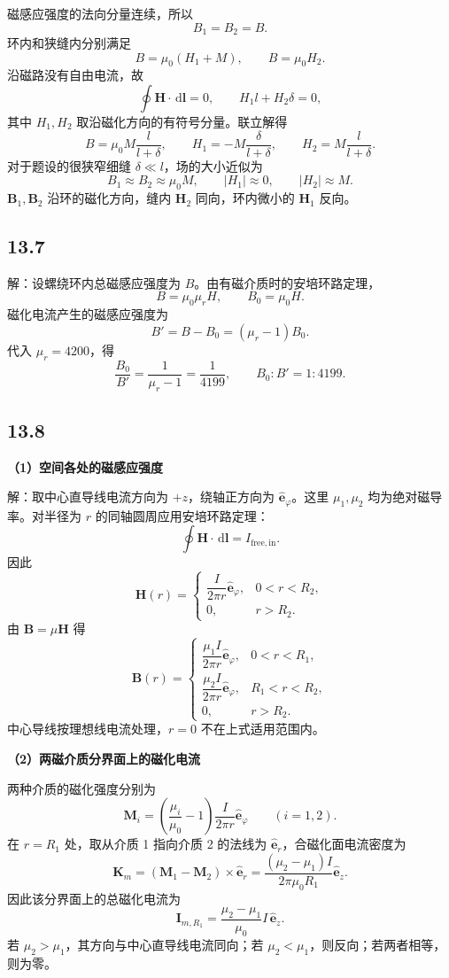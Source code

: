 \documentclass[UTF8,a4paper,12pt]{ctexart}
\newcommand{\dd}{\,\mathrm{d}}
\newcommand{\ez}{\hat{\bm e}_z}
\newcommand{\er}{\hat{\bm e}_r}
\newcommand{\ep}{\hat{\bm e}_{\varphi}}
\begin{document}
磁感应强度的法向分量连续，所以
\[
B_1=B_2=B.
\]
环内和狭缝内分别满足
\[
B=\mu_0(H_1+M),\qquad B=\mu_0H_2.
\]
沿磁路没有自由电流，故
\[
\oint\bm H\cdot\dd\bm l=0,
\qquad H_1l+H_2\delta=0,
\]
其中 $H_1,H_2$ 取沿磁化方向的有符号分量。联立解得
\[
B=\mu_0M\frac{l}{l+\delta},
\qquad
H_1=-M\frac{\delta}{l+\delta},
\qquad
H_2=M\frac{l}{l+\delta}.
\]
对于题设的很狭窄细缝 $\delta\ll l$，场的大小近似为
\[
\boxed{B_1\approx B_2\approx\mu_0M,
\qquad |H_1|\approx0,\qquad |H_2|\approx M}.
\]
$\bm B_1,\bm B_2$ 沿环的磁化方向，缝内 $\bm H_2$ 同向，环内微小的 $\bm H_1$ 反向。

\subsection*{13.7}

解：设螺绕环内总磁感应强度为 $B$。由有磁介质时的安培环路定理，
\[
B=\mu_0\mu_rH,
\qquad B_0=\mu_0H.
\]
磁化电流产生的磁感应强度为
\[
B'=B-B_0=(\mu_r-1)B_0.
\]
代入 $\mu_r=4200$，得
\[
\boxed{\frac{B_0}{B'}=\frac{1}{\mu_r-1}=\frac{1}{4199}},
\qquad \boxed{B_0:B'=1:4199}.
\]

\subsection*{13.8}

\textbf{（1）空间各处的磁感应强度}

解：取中心直导线电流方向为 $+z$，绕轴正方向为 $\ep$。这里 $\mu_1,\mu_2$ 均为绝对磁导率。对半径为 $r$ 的同轴圆周应用安培环路定理：
\[
\oint\bm H\cdot\dd\bm l=I_{\mathrm{free,in}}.
\]
因此
\[
\bm H(r)=
\begin{cases}
\dfrac{I}{2\pi r}\ep,&0<r<R_2,\\[0.5em]
0,&r>R_2.
\end{cases}
\]
由 $\bm B=\mu\bm H$ 得
\[
\boxed{\bm B(r)=
\begin{cases}
\dfrac{\mu_1I}{2\pi r}\ep,&0<r<R_1,\\[0.6em]
\dfrac{\mu_2I}{2\pi r}\ep,&R_1<r<R_2,\\[0.6em]
0,&r>R_2.
\end{cases}}
\]
中心导线按理想线电流处理，$r=0$ 不在上式适用范围内。

\textbf{（2）两磁介质分界面上的磁化电流}

两种介质的磁化强度分别为
\[
\bm M_i=\left(\frac{\mu_i}{\mu_0}-1\right)
\frac{I}{2\pi r}\ep\qquad(i=1,2).
\]
在 $r=R_1$ 处，取从介质 1 指向介质 2 的法线为 $\er$，合磁化面电流密度为
\[
\bm K_m=(\bm M_1-\bm M_2)\times\er
=\frac{(\mu_2-\mu_1)I}{2\pi\mu_0R_1}\ez.
\]
因此该分界面上的总磁化电流为
\[
\boxed{\bm I_{m,R_1}=\frac{\mu_2-\mu_1}{\mu_0}I\,\ez}.
\]
若 $\mu_2>\mu_1$，其方向与中心直导线电流同向；若 $\mu_2<\mu_1$，则反向；若两者相等，则为零。
\end{document}
